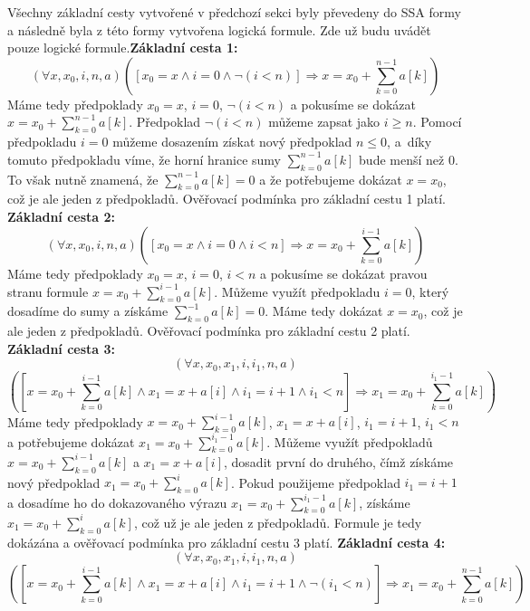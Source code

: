 \documentclass{article}
\begin{document}
Všechny základní cesty vytvořené v předchozí sekci byly převedeny do SSA formy a následně byla z této formy vytvořena logická formule. Zde už budu uvádět pouze logické formule.\newline\newline \textbf{Základní cesta 1:} 
$$(\forall x, x_0, i, n, a)([x_0 = x \wedge i = 0 \wedge \neg(i < n)] \Rightarrow x = x_0 + \sum_{k=0}^{n-1} a[k])$$ 
Máme tedy předpoklady $x_0 = x$, $i = 0$, $\neg(i < n)$ a pokusíme se dokázat $x = x_0 + \sum_{k=0}^{n-1} a[k]$. Předpoklad $\neg(i < n)$ můžeme zapsat jako $i \geq n$. Pomocí předpokladu $i = 0$ můžeme dosazením získat nový předpoklad $n \leq 0$, a~díky tomuto předpokladu víme, že horní hranice sumy $\sum_{k=0}^{n-1} a[k]$ bude menší než 0. To však nutně znamená, že $\sum_{k=0}^{n-1} a[k] = 0$ a že potřebujeme dokázat $x = x_0$, což je ale jeden z předpokladů. Ověřovací podmínka pro základní cestu 1 platí.
\newline\newline \textbf{Základní cesta 2:} $$(\forall x, x_0, i, n, a)([x_0 = x \wedge i = 0 \wedge i < n] \Rightarrow x = x_0 + \sum_{k=0}^{i-1} a[k])$$
Máme tedy předpoklady $x_0 = x$, $i = 0$, $i < n$ a pokusíme se dokázat pravou stranu formule $x = x_0 + \sum_{k=0}^{i-1} a[k]$. Můžeme využít předpokladu $i = 0$, který dosadíme do sumy a získáme $\sum_{k=0}^{-1} a[k] = 0$. Máme tedy dokázat $x = x_0$, což je ale jeden z předpokladů. Ověřovací podmínka pro základní cestu 2 platí.
\newline\newline \textbf{Základní cesta 3:} $$(\forall x, x_0, x_1, i, i_1, n, a)$$  $$([ x = x_0 + \sum_{k=0}^{i-1} a[k] \wedge x_1 = x + a[i] \wedge i_1 =  i + 1 \wedge i_1 < n]\Rightarrow x_1 = x_0 + \sum_{k=0}^{i_1 - 1} a[k])$$
Máme tedy předpoklady $x = x_0 + \sum_{k=0}^{i-1} a[k]$, $x_1 = x + a[i]$, $i_1 =  i + 1$, $i_1 < n$ a potřebujeme dokázat $x_1 = x_0 + \sum_{k=0}^{i_1 - 1} a[k]$. Můžeme využít předpokladů $x = x_0 + \sum_{k=0}^{i-1} a[k]$ a $x_1 = x + a[i]$, dosadit první do druhého, čímž získáme nový předpoklad $x_1 = x_0 + \sum_{k=0}^{i} a[k]$. Pokud použijeme předpoklad $i_1 = i + 1$ a dosadíme ho do dokazovaného výrazu $x_1 = x_0 + \sum_{k=0}^{i_1 - 1} a[k]$, získáme $x_1 = x_0 + \sum_{k=0}^{i} a[k]$, což už je ale jeden z předpokladů. Formule je tedy dokázána a ověřovací podmínka pro základní cestu 3 platí.
\newline\newline \textbf{Základní cesta 4:} \newpage $$(\forall x, x_0, x_1, i, i_1, n, a)$$  $$([ x = x_0 + \sum_{k=0}^{i-1} a[k] \wedge x_1 = x + a[i] \wedge i_1 =  i + 1 \wedge \neg (i_1 < n)]\Rightarrow x_1 = x_0 + \sum_{k=0}^{n - 1} a[k])$$ 
\end{document}
